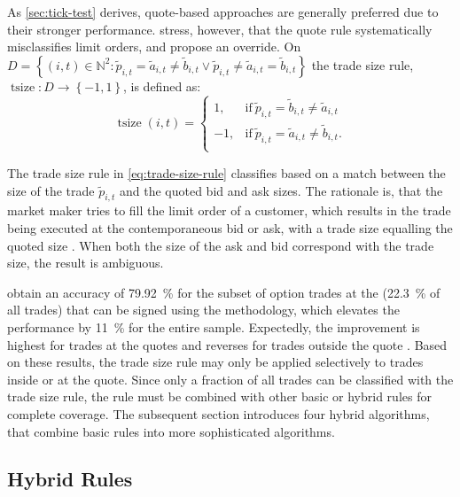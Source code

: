 As \cref{sec:tick-test} derives, quote-based approaches are generally preferred due to their stronger performance. \textcite[][13]{grauerOptionTradeClassification2022} stress, however, that the quote rule systematically misclassifies limit orders, and propose an override. On $D = \left\{(i, t) \in \mathbb{N}^2: \tilde{p}_{i,t} = \tilde{a}_{i,t} \neq \tilde{b}_{i,t} \lor \tilde{p}_{i,t} \neq\tilde{a}_{i,t} = \tilde{b}_{i,t} \right\}$ the trade size rule, $\operatorname{tsize} \colon D \to \left\{-1, 1\right\}$, is defined as:
\begin{equation}
\operatorname{tsize}(i, t)=
\begin{cases}
1, & \text{if}\ \tilde{p}_{i, t} = \tilde{b}_{i, t} \neq \tilde{a}_{i, t}\\
-1,  & \text{if}\ \tilde{p}_{i, t} = \tilde{a}_{i, t} \neq \tilde{b}_{i, t}. \\
\end{cases}
\label{eq:trade-size-rule}
\end{equation}

The trade size rule in \cref{eq:trade-size-rule} classifies based on a match between the size of the trade $\tilde{p}_{i, t}$ and the quoted bid and ask sizes. The rationale is, that the market maker tries to fill the limit order of a customer, which results in the trade being executed at the contemporaneous bid or ask, with a trade size equalling the quoted size \autocite[][13]{grauerOptionTradeClassification2022}. When both the size of the ask and bid correspond with the trade size, the result is ambiguous.

\textcite[][13]{grauerOptionTradeClassification2022} obtain an accuracy of \SI{79.92}{\percent} for the subset of option trades at the (\SI{22.3}{\percent} of all trades) that can be signed using the methodology, which elevates the performance by \SI{11}{\percent} for the entire sample. Expectedly, the improvement is highest for trades at the quotes and reverses for trades outside the quote \autocite[][15]{grauerOptionTradeClassification2022}. Based on these results, the trade size rule may only be applied selectively to trades inside or at the quote. Since only a fraction of all trades can be classified with the trade size rule, the rule must be combined with other basic or hybrid rules for complete coverage. The subsequent section introduces four hybrid algorithms, that combine basic rules into more sophisticated algorithms.

\subsection{Hybrid Rules}\label{sec:hybrid-rules}

